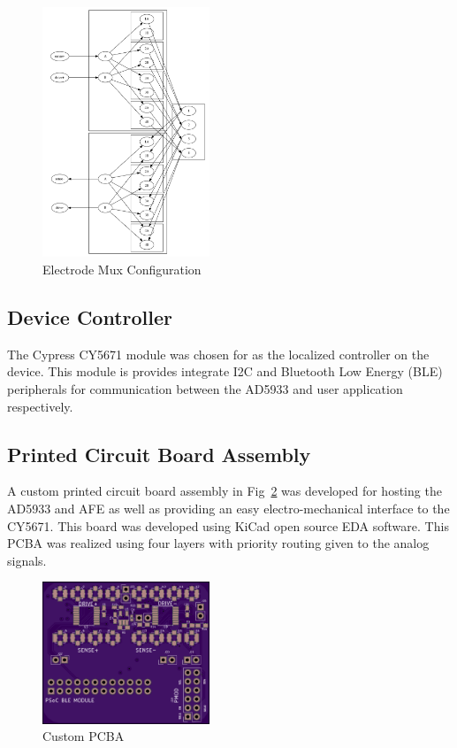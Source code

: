 \documentclass[]{IEEEtran}
\begin{document}
\begin{figure} %
\centering
\includegraphics[width=5cm ]{./graphics/mux.png}
\centering
\caption{Electrode Mux Configuration}
\label{fig:mux}
\end{figure}


\subsection{Device Controller}
The Cypress CY5671\cite{noauthor_cy5671:_nodate} module was chosen for as the localized controller on the device. This module is provides integrate I2C and Bluetooth Low Energy (BLE) peripherals for communication between the AD5933 and user application respectively. 

\subsection{Printed Circuit Board Assembly}
A custom printed circuit board assembly in Fig~\ref{fig:pcb} was developed for hosting the AD5933 and AFE as well as providing an easy electro-mechanical interface to the CY5671. This board was developed using KiCad open source EDA software\cite{noauthor_kicad_nodate}. This PCBA was realized using four layers with priority routing given to the analog signals.

\begin{figure} %
\centering
\includegraphics[width=5cm ]{../graphics/pcb_top.png}
\centering
\caption{Custom PCBA}
\label{fig:pcb}
\end{figure}
\end{document}
